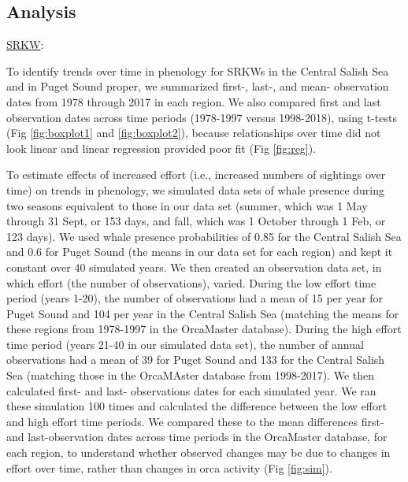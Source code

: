 \documentclass{article}
\begin{document}
\subsection* {Analysis}
\underline{SRKW}:
\par To identify trends over time in phenology for SRKWs in the Central Salish Sea and in Puget Sound proper, we summarized first-, last-, and mean- observation dates from 1978 through 2017 in each region. We also compared first and last observation dates across time periods (1978-1997 versus 1998-2018), using t-tests (Fig \ref{fig:boxplot1} and \ref{fig:boxplot2}), because relationships over time did not look linear and linear regression provided poor fit (Fig \ref{fig:reg}). %
\par  To estimate effects of increased effort (i.e., increased numbers of sightings over time) on trends in phenology, we simulated data sets of whale presence during two seasons equivalent to those in our data set (summer, which was 1 May through 31 Sept, or 153 days, and fall, which was 1 October through 1 Feb, or 123 days). We used whale presence probabilities of 0.85 for the Central Salish Sea and 0.6 for Puget Sound (the means in our data set for each region) and kept it constant over 40 simulated years. We then created an observation data set, in which effort (the number of observations), varied. During the low effort time period (years 1-20), the number of observations had a mean of 15 per year for Puget Sound and 104 per year in the Central Salish Sea (matching the means for these regions from 1978-1997 in the OrcaMaster database).  During the high effort time period (years 21-40 in our simulated data set), the number of annual observations had a mean of 39 for Puget Sound and 133 for the Central Salish Sea (matching those in the OrcaMAster database from 1998-2017). We then calculated first- and last- observations dates for each simulated year. We ran these simulation 100 times and calculated the difference between the low effort and high effort time periods. We compared these to the mean differences first- and last-observation dates across time periods in the OrcaMaster database, for each region, to understand whether observed changes may be due to changes in effort over time, rather than changes in orca activity (Fig \ref{fig:sim}).
\end{document}

